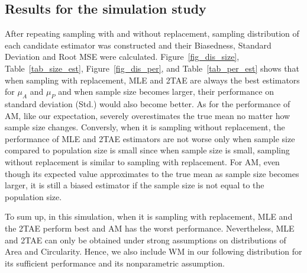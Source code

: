 \documentclass{article}\usepackage[]{graphicx}\usepackage[]{color}
\numberwithin{figure}{subsection} %
\numberwithin{table}{subsection} %
\begin{document}
\newpage

\subsection{Results for the simulation study}
After repeating sampling with and without replacement, sampling distribution of each candidate estimator was constructed and their Biasedness, Standard Deviation and Root MSE were calculated. Figure~\ref{fig_dis_size}, Table~\ref{tab_size_est}, Figure~\ref{fig_dis_per}, and Table~\ref{tab_per_est} shows that when sampling with replacement, MLE and 2TAE are always the best estimators for ${\mu}_{A}$ and ${\mu}_{P}$ and when sample size becomes larger, their performance on standard deviation (Std.) would also become better. As for the performance of AM, like our expectation, severely overestimates the true mean no matter how sample size changes. Conversly, when it is sampling without replacement, the performance of MLE and 2TAE estimators are not worse only when sample size compared to population size is small since when sample size is small, sampling without replacement is similar to sampling with replacement. For AM, even though its expected value approximates to the true mean as sample size becomes larger, it is still a biased estimator if the sample size is not equal to the population size.

To sum up, in this simulation, when it is sampling with replacement, MLE and the 2TAE perform best and AM has the worst performance. Nevertheless, MLE and 2TAE can only be obtained under strong assumptions on distributions of Area and Circularity. Hence, we also include WM in our following distribution for its sufficient performance and its nonparametric assumption. 

\begin{figure}[!htbp]
\centering

  \end{figure}
\end{document}
